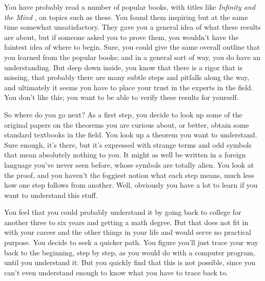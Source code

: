 You have probably read a number of popular books, with titles like {\em
Infinity and the Mind} \cite{Rucker}, on topics such as
these.  You found them inspiring but at the same time somewhat
unsatisfactory.  They gave you a general idea of what these results are about,
but if someone asked you to prove them, you wouldn't have the faintest idea of
where to begin.   Sure, you could give the same overall outline that you
learned from the popular books; and in a general sort of way, you do have an
understanding.  But deep down inside, you know that there is a rigor that is
missing, that probably there are many subtle steps and pitfalls along the way,
and ultimately it seems you have to place your trust in the experts in the
field.  You don't like this; you want to be able to verify these results for
yourself.

So where do you go next?  As a first step, you decide to look up some of the
original papers on the theorems you are curious about, or better, obtain some
standard textbooks in the field.  You look up a theorem you want to
understand.  Sure enough, it's there, but it's expressed with strange
terms and odd symbols that mean absolutely nothing to you.  It might as well be written in
a foreign language you've never seen before, whose symbols are totally alien.
You look at the proof, and you haven't the foggiest notion what each step
means, much less how one step follows from another.  Well, obviously you have
a lot to learn if you want to understand this stuff.

You feel that you could probably understand it by
going back to college for another three to six years and getting a math
degree.  But that does not fit in with your career and the other things in
your life and would serve no practical purpose.  You decide to seek a quicker
path.  You figure you'll just trace your way back to the beginning, step by
step, as you would do with a computer program, until you understand it.  But
you quickly find that this is not possible, since you can't even understand
enough to know what you have to trace back to.

